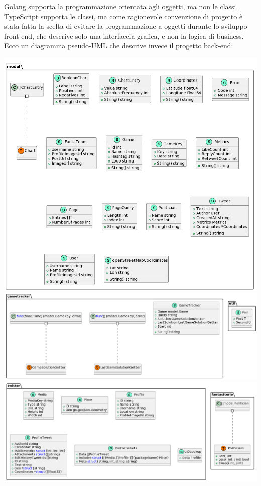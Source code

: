 \documentclass{article}
\begin{document}
Golang supporta la programmazione orientata agli oggetti, ma non le classi.
TypeScript supporta le classi, ma come ragionevole convenzione di progetto è
stata fatta la scelta di evitare la programmazione a oggetti durante lo
sviluppo front-end, che descrive solo una interfaccia grafica, e non la logica
di business. Ecco un diagramma pseudo-UML che descrive invece il progetto
back-end:

\includegraphics[width=\textwidth]{backend-model}
\includegraphics[width=\textwidth]{backend-gametracker-util}
\includegraphics[width=\textwidth]{backend-twitter-fantacitorio}
\end{document}

